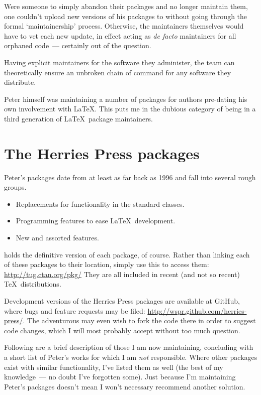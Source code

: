 \documentclass{ltugboat}
\begin{document}
Were someone to simply abandon their packages and no longer maintain them, one couldn't upload new versions of his packages to  without going through the formal `maintainership' process. Otherwise, the  maintainers themselves would have to vet each new update, in effect acting as \emph{de facto} maintainers for all orphaned code~--- certainly out of the question.

Having explicit maintainers for the software they administer, the  team can theoretically ensure an unbroken chain of command for any software they distribute.

Peter himself was maintaining a number of packages for authors pre-dating his own involvement with \LaTeX. This puts me in the dubious category of being in a third generation of \LaTeX\ package maintainers.

\section{The Herries Press packages}

Peter's packages date from at least as far back as 1996 and fall into several rough groups.
\begin{itemize}
\item Replacements for functionality in the standard classes.
\item Programming features to ease \LaTeX\ development.
\item New and assorted features.
\end{itemize}
 holds the definitive version of each package, of course. Rather than linking each of these packages to their  location, simply use this  to access them: \url{http://tug.ctan.org/pkg/}
They are all included in recent (and not so recent) \TeX\ distributions.

Development versions of the Herries Press packages are available at GitHub, where bugs and feature requests may be filed: \url{http://wspr.github.com/herries-press/}. The adventurous may even wish to fork the code there in order to suggest code changes, which I will most probably accept without too much question.

Following are a brief description of those I am now maintaining, concluding with a short list of Peter's works for which I am \emph{not} responsible. Where other packages exist with similar functionality, I've listed them as well (the best of my knowledge~--- no doubt I've forgotten some). Just because I'm maintaining Peter's packages doesn't mean I won't necessary recommend another solution.
\end{document}
